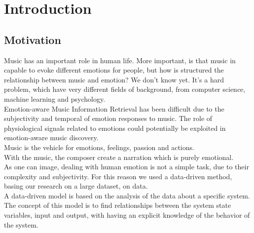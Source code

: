 \chapter{Introduction}
\label{Introduction}
\pagestyle{plain}

\vspace{0.5cm}

\section{Motivation}
Music has an important role in human life. More important, is that music in capable to evoke different emotions for people, but how is structured the relationship between music and emotion? We don't know yet. It's a hard problem, which have very different fields of background, from computer science, machine learning and psychology.
\\ \indent
Emotion-aware Music Information Retrieval has been difficult due to the subjectivity and temporal of emotion responses to music. The role of physiological signals related to emotions could potentially be exploited in emotion-aware music discovery.
\\ \indent
Music is the vehicle for emotions, feelings, passion and actions.
\\
With the music, the composer create a narration which is purely emotional.
\\ \indent
As one can image, dealing with human emotion is not a simple task, due to their complexity and subjectivity. For this reason we used a data-driven method, basing our research on a large dataset, on data.
\\
A data-driven model is based on the analysis of the data about a specific system. The concept of this model is to find relationships between the system state variables, input and output, with having an explicit knowledge of the behavior of the system.

